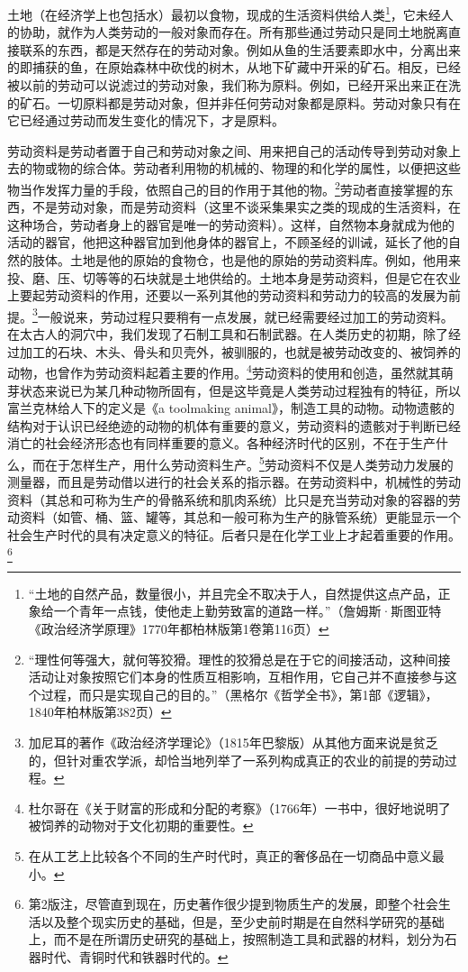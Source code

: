 \documentclass{ctexbook}
\begin{document}
    土地（在经济学上也包括水）最初以食物，现成的生活资料供给人类\footnote{“土地的自然产品，数量很小，并且完全不取决于人，自然提供这点产品，正象给一个青年一点钱，使他走上勤劳致富的道路一样。”（詹姆斯·斯图亚特《政治经济学原理》1770年都柏林版第1卷第116页）}，它未经人的协助，就作为人类劳动的一般对象而存在。所有那些通过劳动只是同土地脱离直接联系的东西，都是天然存在的劳动对象。例如从鱼的生活要素即水中，分离出来的即捕获的鱼，在原始森林中砍伐的树木，从地下矿藏中开采的矿石。相反，已经被以前的劳动可以说滤过的劳动对象，我们称为原料。例如，已经开采出来正在洗的矿石。一切原料都是劳动对象，但并非任何劳动对象都是原料。劳动对象只有在它已经通过劳动而发生变化的情况下，才是原料。

    劳动资料是劳动者置于自己和劳动对象之间、用来把自己的活动传导到劳动对象上去的物或物的综合体。劳动者利用物的机械的、物理的和化学的属性，以便把这些物当作发挥力量的手段，依照自己的目的作用于其他的物。\footnote{“理性何等强大，就何等狡猾。理性的狡猾总是在于它的间接活动，这种间接活动让对象按照它们本身的性质互相影响，互相作用，它自己并不直接参与这个过程，而只是实现自己的目的。”（黑格尔《哲学全书》，第1部《逻辑》，1840年柏林版第382页）}劳动者直接掌握的东西，不是劳动对象，而是劳动资料（这里不谈采集果实之类的现成的生活资料，在这种场合，劳动者身上的器官是唯一的劳动资料）。这样，自然物本身就成为他的活动的器官，他把这种器官加到他身体的器官上，不顾圣经的训诫，延长了他的自然的肢体。土地是他的原始的食物仓，也是他的原始的劳动资料库。例如，他用来投、磨、压、切等等的石块就是土地供给的。土地本身是劳动资料，但是它在农业上要起劳动资料的作用，还要以一系列其他的劳动资料和劳动力的较高的发展为前提。\footnote{加尼耳的著作《政治经济学理论》（1815年巴黎版）从其他方面来说是贫乏的，但针对重农学派，却恰当地列举了一系列构成真正的农业的前提的劳动过程。}一般说来，劳动过程只要稍有一点发展，就已经需要经过加工的劳动资料。在太古人的洞穴中，我们发现了石制工具和石制武器。在人类历史的初期，除了经过加工的石块、木头、骨头和贝壳外，被驯服的，也就是被劳动改变的、被饲养的动物，也曾作为劳动资料起着主要的作用。\footnote{杜尔哥在《关于财富的形成和分配的考察》（1766年）一书中，很好地说明了被饲养的动物对于文化初期的重要性。}劳动资料的使用和创造，虽然就其萌芽状态来说已为某几种动物所固有，但是这毕竟是人类劳动过程独有的特征，所以富兰克林给人下的定义是《a toolmaking animal》，制造工具的动物。动物遗骸的结构对于认识已经绝迹的动物的机体有重要的意义，劳动资料的遗骸对于判断已经消亡的社会经济形态也有同样重要的意义。各种经济时代的区别，不在于生产什么，而在于怎样生产，用什么劳动资料生产。\footnote{在从工艺上比较各个不同的生产时代时，真正的奢侈品在一切商品中意义最小。}劳动资料不仅是人类劳动力发展的测量器，而且是劳动借以进行的社会关系的指示器。在劳动资料中，机械性的劳动资料（其总和可称为生产的骨骼系统和肌肉系统）比只是充当劳动对象的容器的劳动资料（如管、桶、篮、罐等，其总和一般可称为生产的脉管系统）更能显示一个社会生产时代的具有决定意义的特征。后者只是在化学工业上才起着重要的作用。\footnote{第2版注，尽管直到现在，历史著作很少提到物质生产的发展，即整个社会生活以及整个现实历史的基础，但是，至少史前时期是在自然科学研究的基础上，而不是在所谓历史研究的基础上，按照制造工具和武器的材料，划分为石器时代、青铜时代和铁器时代的。}
\end{document}
